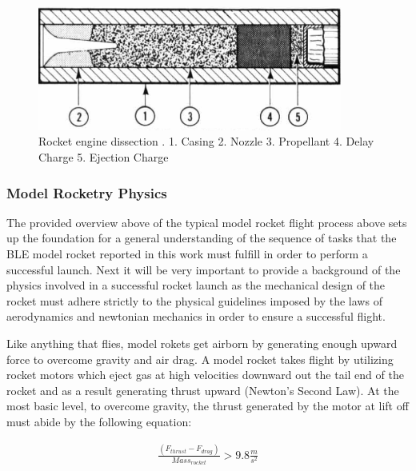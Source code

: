 \documentclass{workreport}
\begin{document}
\begin{body}
	\begin{figure}[!ht]
		\centering
		\includegraphics[width=10cm]{./images/dissection.png}
		\caption{Rocket engine dissection \cite{centuri_manual}. 1. Casing 2. Nozzle 3. Propellant 4. Delay Charge 5. Ejection Charge}
		\label{fig:dissection}
	\end{figure}



\subsubsection{Model Rocketry Physics}

	The provided overview above of the typical model rocket flight process above sets up the foundation for a general understanding of the sequence of tasks that the BLE model rocket reported in this work must fulfill in order to perform a successful launch. Next it will be very important to provide a background of the physics involved in a successful rocket launch as the mechanical design of the rocket must adhere strictly to the physical guidelines imposed by the laws of aerodynamics and newtonian mechanics in order to ensure a successful flight.

	Like anything that flies, model rokets get airborn by generating enough upward force to overcome gravity and air drag. A model rocket takes flight by utilizing rocket motors which eject gas at high velocities downward out the tail end of the rocket and as a result generating thrust upward (Newton's Second Law). At the most basic level, to overcome gravity, the thrust generated by the motor at lift off must abide by the following equation:

	\begin{align}
		\frac{(F_{thrust} - F_{drag})}{Mass_{rocket}} > 9.8 \frac{m}{s^2}
	\end{align}


\end{body}
\end{document}
